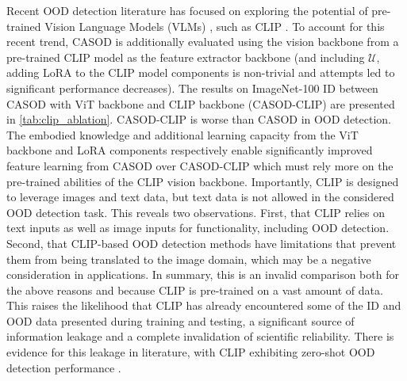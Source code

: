 Recent OOD detection literature has focused on exploring the potential of pre-trained Vision Language Models (VLMs) \cite{miyai2024locoop,li2025synthesizing,jiang2024negative}, such as CLIP \cite{radford2021learning}. To account for this recent trend, CASOD is additionally evaluated using the vision backbone from a pre-trained CLIP model as the feature extractor backbone (and including $\mathcal{U}$, adding LoRA to the CLIP model components is non-trivial and attempts led to significant performance decreases). The results on ImageNet-100 ID between CASOD with ViT backbone and CLIP backbone (CASOD-CLIP) are presented in \ref{tab:clip_ablation}. CASOD-CLIP is worse than CASOD in OOD detection. The embodied knowledge and additional learning capacity from the ViT backbone and LoRA components respectively enable significantly improved feature learning from CASOD over CASOD-CLIP which must rely more on the pre-trained abilities of the CLIP vision backbone. Importantly, CLIP is designed to leverage images and text data, but text data is not allowed in the considered OOD detection task. This reveals two observations. First, that CLIP relies on text inputs as well as image inputs for functionality, including OOD detection. Second, that CLIP-based OOD detection methods have limitations that prevent them from being translated to the image domain, which may be a negative consideration in applications. In summary, this is an invalid comparison both for the above reasons and because CLIP is pre-trained on a vast amount of data. This raises the likelihood that CLIP has already encountered some of the ID and OOD data presented during training and testing, a significant source of information leakage and a complete invalidation of scientific reliability. There is evidence for this leakage in literature, with CLIP exhibiting zero-shot OOD detection performance \cite{esmaeilpour2022zero}.

\begin{table}[htp!]
	\small
	\centering
\vspace{0.1cm}
	\caption{ 
		Ablation OOD detection results (AUC) for ImageNet-100-Random ID between \sys and \sys when trained without individual view feature losses ($\mathcal{L}_{CE,fused}$ only). %
	}
	\label{tab:nomvloss_ablations}
\end{table}

